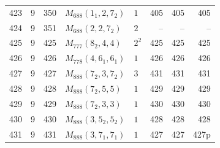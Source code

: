 \documentclass[11pt,a4paper]{article}
\begin{document}
\begin{longtable}{rrr|l|l|rrr}
423 & 9 & 350 & $M_{688}(1_1,2,7_2)$ & $1$ & 405 & 405 & 405\\
424 & 9 & 351 & $M_{688}(2,2,7_2)$ & $2$ & -- & -- & --\\
425 & 9 & 425 & $M_{777}(8_2,4,4)$ & $2^2$ & 425 & 425 & 425\\
426 & 9 & 426 & $M_{778}(4,6_1,6_1)$ & $1$ & 426 & 426 & 426\\
427 & 9 & 427 & $M_{888}(7_2,3,7_2)$ & $3$ & 431 & 431 & 431\\
428 & 9 & 428 & $M_{888}(7_2,5,5)$ & $1$ & 429 & 429 & 429\\
429 & 9 & 429 & $M_{888}(7_2,3,3)$ & $1$ & 430 & 430 & 430\\
430 & 9 & 430 & $M_{888}(3,5_2,5_2)$ & $1$ & 428 & 428 & 428\\
431 & 9 & 431 & $M_{888}(3,7_1,7_1)$ & $1$ & 427 & 427 & 427p\\
\bottomrule\end{longtable}
\end{document}

